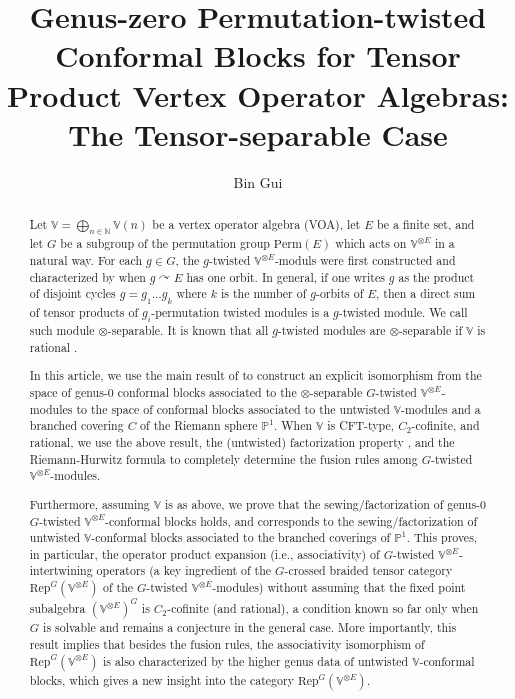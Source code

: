 \documentclass[12pt,a4paper,notitlepage]{article}
\title{Genus-zero Permutation-twisted Conformal Blocks for Tensor Product Vertex Operator Algebras: The Tensor-separable Case}
\author{{\sc Bin Gui}
}
\date{}
\theoremstyle{definition}
\theoremstyle{plain}
\newcommand{\Rep}{\mathrm{Rep}}
\newcommand{\Vbb}{\mathbb V}
\newcommand{\Nbb}{\mathbb N}
\newcommand{\Pbb}{\mathbb P}
\newcommand{\Perm}{\mathrm{Perm}}
\numberwithin{equation}{subsection}
\begin{document}
\sloppy %
	\setcounter{section}{-1}
	
	
	
	\maketitle
	
	
\newcommand\blfootnote[1]{%
	\begingroup
	\renewcommand\thefootnote{}\footnote{#1}%
	\addtocounter{footnote}{-1}%
	\endgroup
}



\begin{abstract}
Let $\Vbb=\bigoplus_{n\in\Nbb}\Vbb(n)$ be a  vertex operator algebra (VOA),  let $E$ be a finite set, and let $G$ be a subgroup of the permutation group $\Perm(E)$ which acts on $\Vbb^{\otimes E}$ in a natural way. For each $g\in G$, the $g$-twisted $\Vbb^{\otimes E}$-moduls were first constructed and characterized by \cite{BDM02} when $g\curvearrowright E$ has one orbit. In general, if one writes $g$ as the product of disjoint cycles $g=g_1\dots g_k$ where $k$ is the number of $g$-orbits of $E$, then a direct sum of tensor products of $g_i$-permutation twisted modules is a $g$-twisted module. We call such module $\otimes$-separable. It is known that  all $g$-twisted modules are $\otimes$-separable if $\Vbb$ is rational \cite{BDM02}.

In this article, we use the main result of \cite{Gui21b} to construct an explicit isomorphism from the space of genus-$0$ conformal blocks associated to the $\otimes$-separable $G$-twisted $\Vbb^{\otimes E}$-modules to the space of conformal blocks associated to the untwisted $\Vbb$-modules and a branched covering $C$ of the Riemann sphere $\Pbb^1$. When $\Vbb$ is CFT-type, $C_2$-cofinite, and rational, we use the above result, the (untwisted) factorization property \cite{DGT19b}, and the Riemann-Hurwitz formula to completely determine the fusion rules among $G$-twisted $\Vbb^{\otimes E}$-modules. 

Furthermore, assuming $\Vbb$ is as above, we prove that the sewing/factorization of genus-$0$ $G$-twisted $\Vbb^{\otimes E}$-conformal blocks holds, and corresponds to the sewing/factorization of  untwisted $\Vbb$-conformal blocks associated to the branched coverings of $\Pbb^1$. This proves, in particular, the operator product expansion (i.e., associativity) of $G$-twisted $\Vbb^{\otimes E}$-intertwining operators (a key ingredient of the $G$-crossed braided tensor category $\Rep^G(\Vbb^{\otimes E})$ of the $G$-twisted $\Vbb^{\otimes E}$-modules) without assuming that the fixed point subalgebra $(\Vbb^{\otimes E})^G$ is $C_2$-cofinite (and rational), a condition known so far only when $G$ is solvable and remains a conjecture in the general case. More importantly, this result implies that besides the fusion rules, the associativity isomorphism of $\Rep^G(\Vbb^{\otimes E})$ is also characterized by the higher genus data of untwisted $\Vbb$-conformal blocks, which gives a new insight into the category $\Rep^G(\Vbb^{\otimes E})$.


\end{abstract}
\end{document}

